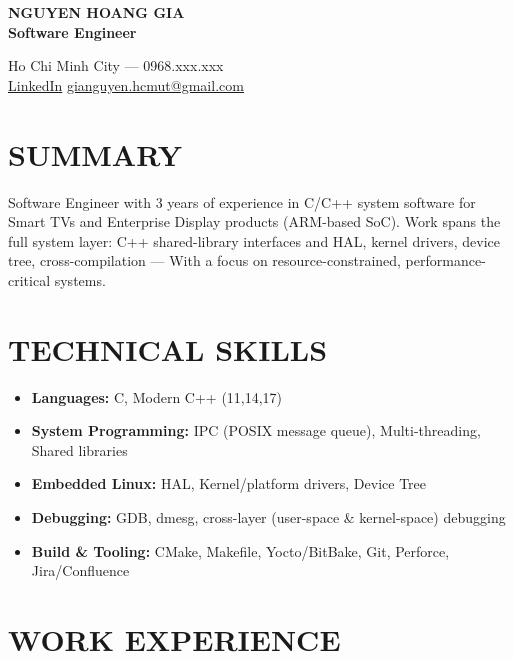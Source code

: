 \documentclass[a4paper,10pt]{article}
\begin{document}
\pagestyle{empty}

\begin{minipage}[t]{0.55\textwidth}
    {\LARGE \textbf{NGUYEN HOANG GIA}} \\[5pt]
    {\large \textbf{Software Engineer}}
\end{minipage}%
\begin{minipage}[t]{0.45\textwidth}
    \raggedleft
    \vspace{2pt}
    Ho Chi Minh City --- 0968.xxx.xxx \\
    \href{https://www.linkedin.com/in/gia-nguyen-6a007b294/}{LinkedIn} \textbar{} \href{mailto:gianguyen.xxx@gmail.com}{gianguyen.hcmut@gmail.com} \\
\end{minipage}

\vspace{4pt}

\section*{SUMMARY}
Software Engineer with 3 years of experience in C/C++ system software for Smart TVs and Enterprise Display products (ARM-based SoC). 
Work spans the full system layer: C++ shared-library interfaces and HAL, kernel drivers, device tree, cross-compilation --- With a focus on 
resource-constrained, performance-critical systems.

\section*{TECHNICAL SKILLS}
\begin{itemize}
    \item \textbf{Languages:} C, Modern C++ (11,14,17)
    \item \textbf{System Programming:} IPC (POSIX message queue), Multi-threading, Shared libraries
    \item \textbf{Embedded Linux:} HAL, Kernel/platform drivers, Device Tree
    \item \textbf{Debugging:} GDB, dmesg, cross-layer (user-space \& kernel-space) debugging
    \item \textbf{Build \& Tooling:} CMake, Makefile, Yocto/BitBake, Git, Perforce, Jira/Confluence
\end{itemize}

\section*{WORK EXPERIENCE}
\end{document}
